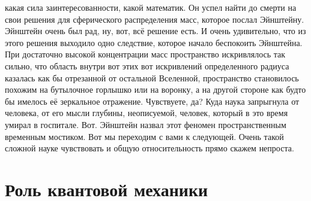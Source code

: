 какая сила заинтересованности, какой математик. Он успел найти до смерти на свои
решения для сферического распределения масс, которое послал Эйнштейну. Эйнштейн
очень был рад, ну, вот, всё решение есть. И очень удивительно, что из этого
решения выходило одно следствие, которое начало беспокоить Эйнштейна. При
достаточно высокой концентрации масс пространство искривлялось так сильно, что
область внутри вот этих вот искривлений определенного радиуса казалась как бы
отрезанной от остальной Вселенной, пространство становилось похожим на
бутылочное горлышко или на воронку, а на другой стороне как будто бы имелось её
зеркальное отражение. Чувствуете, да? Куда наука запрыгнула от человека, от его
мысли глубины, неописуемой, человек, который в это время умирал в госпитале.
Вот. Эйнштейн назвал этот феномен пространственным временным мостиком. Вот мы
переходим с вами к следующей. Очень такой сложной науке чувствовать и общую
относительность прямо скажем непроста. 

\section{Роль квантовой механики}

